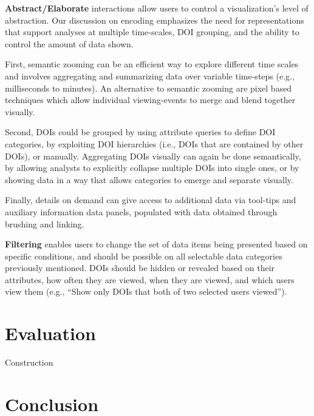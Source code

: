 \noindent \textbf{Abstract/Elaborate} interactions allow users to control a visualization's level of abstraction. Our discussion on encoding emphasizes the need for representations that support analyses at multiple time-scales, DOI grouping, and the ability to control the amount of data shown. 

First, semantic zooming can be an efficient way to explore different time scales and involves aggregating and summarizing data over variable time-steps (e.g., milliseconds to minutes). An alternative to semantic zooming are pixel based techniques which allow individual viewing-events to merge and blend together visually\cite{keim2000designing}. 

Second, DOIs could be grouped by using attribute queries to define DOI categories, by exploiting DOI hierarchies (i.e., DOIs that are contained by other DOIs), or manually. Aggregating DOIs visually can again be done semantically, by allowing analysts to explicitly collapse multiple DOIs into single ones, or by showing data in a way that allows categories to emerge and separate visually. 

 Finally, details on demand can give access to additional data via tool-tips and auxiliary information data panels, populated with data obtained through brushing and linking.
  
	
\noindent \textbf{Filtering} enables users to change the set of data items being presented based on specific conditions, and should be possible on all selectable data categories previously mentioned. DOIs should be hidden or revealed based on their attributes, how often they are viewed, when they are viewed, and which users view them (e.g., ``Show only DOIs that both of two selected users viewed'').
	


\section{Evaluation}
Construction
\section{Conclusion}
